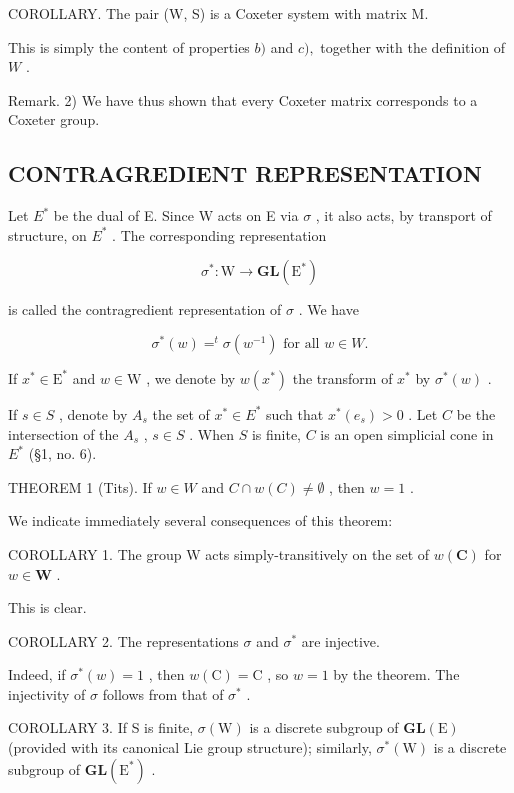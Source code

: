 COROLLARY. The pair (W, S) is a Coxeter system with matrix M.

This is simply the content of properties \(b)\) and \(c),\) together with the definition of \(W\) .

Remark. 2) We have thus shown that every Coxeter matrix corresponds to a Coxeter group.

\subsection{CONTRAGREDIENT REPRESENTATION}

Let \(E^{*}\) be the dual of E. Since W acts on E via \(\sigma\) , it also acts, by transport of structure, on \(E^{*}\) . The corresponding representation

\[
\sigma^ {*}: \mathrm{W} \to \mathbf {G L} (\mathrm{E} ^ {*})
\]

is called the contragredient representation of \(\sigma\) . We have

\[
\sigma^ {*} (w) = ^ {t} \sigma \left(w ^ {- 1}\right) \text {   for   all   } w \in W.
\]

If \(x^{*} \in \mathrm{E}^{*}\) and \(w \in \mathrm{W}\) , we denote by \(w(x^{*})\) the transform of \(x^{*}\) by \(\sigma^{*}(w)\) .

If \(s \in S\) , denote by \(A_s\) the set of \(x^* \in E^*\) such that \(x^*(e_s) > 0\) . Let \(C\) be the intersection of the \(A_s\) , \(s \in S\) . When \(S\) is finite, \(C\) is an open simplicial cone in \(E^*\) (§1, no. 6).

THEOREM 1 (Tits). If \(w \in W\) and \(C \cap w(C) \neq \emptyset\) , then \(w = 1\) .

We indicate immediately several consequences of this theorem:

COROLLARY 1. The group W acts simply-transitively on the set of \(w(\mathbf{C})\) for \(w \in \mathbf{W}\) .

This is clear.

COROLLARY 2. The representations \(\sigma\) and \(\sigma^{*}\) are injective.

Indeed, if \(\sigma^{*}(w) = 1\) , then \(w(\mathrm{C}) = \mathrm{C}\) , so \(w = 1\) by the theorem. The injectivity of \(\sigma\) follows from that of \(\sigma^{*}\) .

COROLLARY 3. If S is finite, \(\sigma(\mathrm{W})\) is a discrete subgroup of \(\mathbf{GL}(\mathrm{E})\) (provided with its canonical Lie group structure); similarly, \(\sigma^{*}(\mathrm{W})\) is a discrete subgroup of \(\mathbf{GL}(\mathrm{E}^{*})\) .

